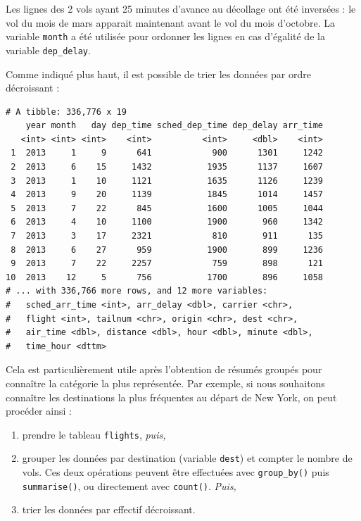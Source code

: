 \documentclass[a4paperpaper,]{article}
\newenvironment{Shaded}{\begin{snugshade}}{\end{snugshade}}
\newcommand{\KeywordTok}[1]{\textcolor[rgb]{0.12,0.11,0.11}{\textbf{#1}}}
\newcommand{\NormalTok}[1]{\textcolor[rgb]{0.12,0.11,0.11}{#1}}
\newcommand{\OperatorTok}[1]{\textcolor[rgb]{0.12,0.11,0.11}{#1}}
\newcommand{\StringTok}[1]{\textcolor[rgb]{0.75,0.01,0.01}{#1}}
\providecommand{\tightlist}{%
  \setlength{\itemsep}{0pt}\setlength{\parskip}{0pt}}
\begin{document}
Les lignes des 2 vols ayant 25 minutes d'avance au décollage ont été inversées : le vol du mois de mars apparait maintenant avant le vol du mois d'octobre. La variable \texttt{month} a été utilisée pour ordonner les lignes en cas d'égalité de la variable \texttt{dep\_delay}.

Comme indiqué plus haut, il est possible de trier les données par ordre décroissant :

\begin{Shaded}
\end{Shaded}

\begin{verbatim}
# A tibble: 336,776 x 19
    year month   day dep_time sched_dep_time dep_delay arr_time
   <int> <int> <int>    <int>          <int>     <dbl>    <int>
 1  2013     1     9      641            900      1301     1242
 2  2013     6    15     1432           1935      1137     1607
 3  2013     1    10     1121           1635      1126     1239
 4  2013     9    20     1139           1845      1014     1457
 5  2013     7    22      845           1600      1005     1044
 6  2013     4    10     1100           1900       960     1342
 7  2013     3    17     2321            810       911      135
 8  2013     6    27      959           1900       899     1236
 9  2013     7    22     2257            759       898      121
10  2013    12     5      756           1700       896     1058
# ... with 336,766 more rows, and 12 more variables:
#   sched_arr_time <int>, arr_delay <dbl>, carrier <chr>,
#   flight <int>, tailnum <chr>, origin <chr>, dest <chr>,
#   air_time <dbl>, distance <dbl>, hour <dbl>, minute <dbl>,
#   time_hour <dttm>
\end{verbatim}

Cela est particulièrement utile après l'obtention de résumés groupés pour connaître la catégorie la plus représentée. Par exemple, si nous souhaitons connaître les destinations la plus fréquentes au départ de New York, on peut procéder ainsi :

\begin{enumerate}
\def\labelenumi{\arabic{enumi}.}
\tightlist
\item
  prendre le tableau \texttt{flights}, \emph{puis,}
\item
  grouper les données par destination (variable \texttt{dest}) et compter le nombre de vols. Ces deux opérations peuvent être effectuées avec \texttt{group\_by()} puis \texttt{summarise()}, ou directement avec \texttt{count()}. \emph{Puis,}
\item
  trier les données par effectif décroissant.
\end{enumerate}
\end{document}
